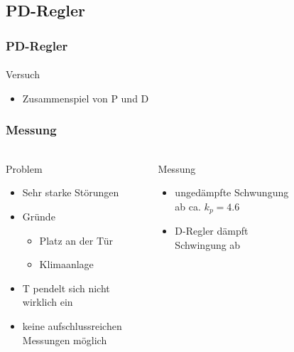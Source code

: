 \subsection{PD-Regler} %
\label{sub:PD-Regler}
\begin{frame}
    \frametitle{PD-Regler}
    \framesubtitle{}
    \begin{block}{Versuch}
        \begin{itemize}
            \item Zusammenspiel von P und D
        \end{itemize}    
    \end{block}
\end{frame}
\begin{frame}
    \frametitle{Messung}
    \framesubtitle{}
     \begin{columns}[c]
        \begin{alertblock}{Problem}
             \begin{itemize}
                 \item Sehr starke Störungen
                 \item Gründe
                 \begin{itemize}
                     \item Platz an der Tür
                     \item Klimaanlage
                 \end{itemize}
                 \item T pendelt sich nicht wirklich ein
                 \item keine aufschlussreichen Messungen möglich
             \end{itemize}
        \end{alertblock}
        \begin{block}{Messung}
            \begin{itemize}
                \item ungedämpfte Schwungung ab ca. $k_p=4.6$
                \item D-Regler dämpft Schwingung ab
            \end{itemize}
        \end{block}
        \begin{figure}[H]
        \begin{center}

\end{center}
\end{figure}
\end{columns}
\end{frame}
